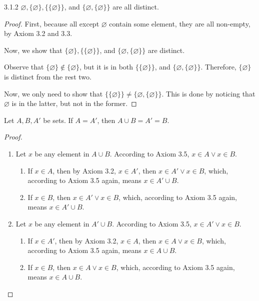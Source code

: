 \begin{exercise}{3.1.2}
	$\varnothing, \{\varnothing\}, \{\{\varnothing\}\}$, and $\{\varnothing,\{\varnothing\}\}$ are all distinct.
\end{exercise}
\begin{proof}
	First, because all except $\varnothing$ contain some element, they are all non-empty, by Axiom 3.2 and 3.3.
	
	Now, we show that $\{\varnothing\}, \{\{\varnothing\}\}$, and $\{\varnothing,\{\varnothing\}\}$ are distinct. 
	
	Observe that $\{\varnothing\} \notin \{\varnothing\}$, but it is in both $\{\{\varnothing\}\}$, and $\{\varnothing,\{\varnothing\}\}$. Therefore, $\{\varnothing\}$ is distinct from the rest two.
	
	Now, we only need to show that $\{\{\varnothing\}\} \ne \{\varnothing,\{\varnothing\}\}$. This is done by noticing that $\varnothing$ is in the latter, but not in the former.
\end{proof}

\begin{why}{30}
	Let $A,B,A'$ be sets. If $A = A'$, then $A \cup B = A' = B$.
\end{why}
\begin{proof}\leavevmode
	\begin{enumerate}
		\item Let $x$ be any element in $A \cup B$. According to Axiom 3.5, $x \in A \vee x \in B$. 
		\begin{enumerate}
			\item If $x \in A$, then by Axiom 3.2, $x \in A'$, then $x \in A' \vee x \in B$, which, according to Axiom 3.5 again, means $x \in A' \cup B$. 
			\item If $x \in B$, then $x \in A' \vee x \in B$, which, according to Axiom 3.5 again, means $x \in A' \cup B$.
		\end{enumerate}
		
		\item Let $x$ be any element in $A' \cup B$. According to Axiom 3.5, $x \in A' \vee x \in B$. 
		\begin{enumerate}
			\item If $x \in A'$, then by Axiom 3.2, $x \in A$, then $x \in A \vee x \in B$, which, according to Axiom 3.5 again, means $x \in A \cup B$. 
			\item If $x \in B$, then $x \in A \vee x \in B$, which, according to Axiom 3.5 again, means $x \in A \cup B$.
		\end{enumerate}
	\end{enumerate}
\end{proof}

